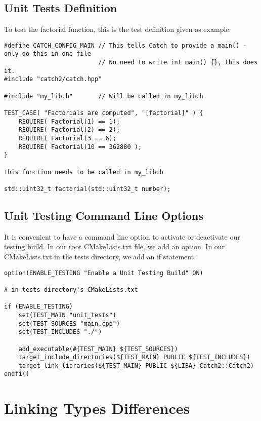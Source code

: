 \documentclass[openany]{report}
\begin{document}
\subsection{Unit Tests Definition}

To test the factorial function, this is the test definition given as example.

\begin{verbatim}
#define CATCH_CONFIG_MAIN // This tells Catch to provide a main() - only do this in one file
                          // No need to write int main() {}, this does it. 
#include "catch2/catch.hpp"

#include "my_lib.h"       // Will be called in my_lib.h

TEST_CASE( "Factorials are computed", "[factorial]" ) {
    REQUIRE( Factorial(1) == 1);
    REQUIRE( Factorial(2) == 2);
    REQUIRE( Factorial(3 == 6);
    REQUIRE( Factorial(10 == 362880 );
}

This function needs to be called in my_lib.h

std::uint32_t factorial(std::uint32_t number);
\end{verbatim}


\subsection{Unit Testing Command Line Options}

It is convenient to have a command line option to activate or deactivate our testing build. In our root CMakeLists.txt
file, we add an option. In our CMakeLists.txt in the tests directory, we add an if statement. 

\begin{verbatim}
option(ENABLE_TESTING "Enable a Unit Testing Build" ON) 

# in tests directory's CMakeLists.txt

if (ENABLE_TESTING)
    set(TEST_MAIN "unit_tests")
    set(TEST_SOURCES "main.cpp")
    set(TEST_INCLUDES "./")

    add_executable(#{TEST_MAIN} ${TEST_SOURCES})
    target_include_directories(${TEST_MAIN} PUBLIC ${TEST_INCLUDES})
    target_link_libraries(${TEST_MAIN} PUBLIC ${LIBA} Catch2::Catch2)
endfi()
\end{verbatim}

\section{Linking Types Differences} 
\end{document}

